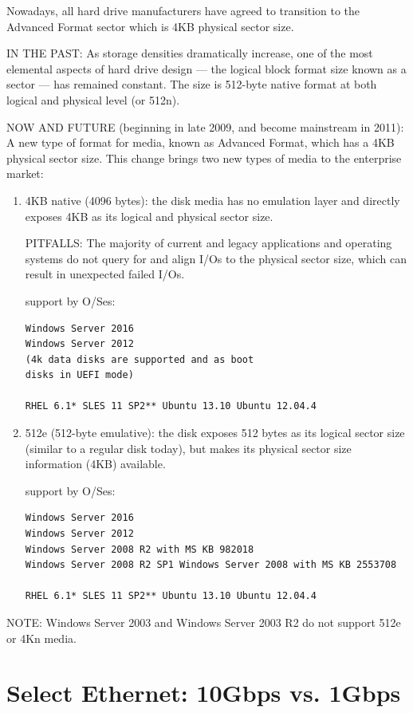 Nowadays, all hard drive manufacturers have agreed to transition to the Advanced
Format sector which is 4KB physical sector size.


IN THE PAST: As storage densities dramatically increase, one of the most
elemental aspects of hard drive design — the logical block format size known as
a sector — has remained constant. The size is 512-byte native format at both
logical and physical level (or 512n).


NOW AND FUTURE (beginning in late 2009, and become mainstream in 2011): A new
type of format for media, known as Advanced Format, which has a 4KB physical
sector size. This change brings two new types of media to the enterprise market:
\begin{enumerate}
  
  \item  4KB native (4096 bytes): the disk media has no emulation layer and directly exposes
  4KB as its logical and physical sector size.
  
 PITFALLS: The majority of current and legacy applications and operating systems
 do not query for and align I/Os to the physical sector size, which can result
 in unexpected failed I/Os.
  
support by O/Ses: 
\begin{verbatim}
Windows Server 2016
Windows Server 2012
(4k data disks are supported and as boot
disks in UEFI mode)

RHEL 6.1* SLES 11 SP2** Ubuntu 13.10 Ubuntu 12.04.4
\end{verbatim}
  
  \item 512e (512-byte emulative): the disk exposes 512 bytes as its logical
  sector size (similar to a regular disk today), but makes its physical sector
  size information (4KB) available.
  
  support by O/Ses: 
\begin{verbatim}
Windows Server 2016
Windows Server 2012
Windows Server 2008 R2 with MS KB 982018
Windows Server 2008 R2 SP1 Windows Server 2008 with MS KB 2553708

RHEL 6.1* SLES 11 SP2** Ubuntu 13.10 Ubuntu 12.04.4
\end{verbatim}

  
\end{enumerate}
NOTE: Windows Server 2003 and Windows Server 2003 R2 do not support 512e or 4Kn media.




\section{Select Ethernet: 10Gbps vs. 1Gbps}


